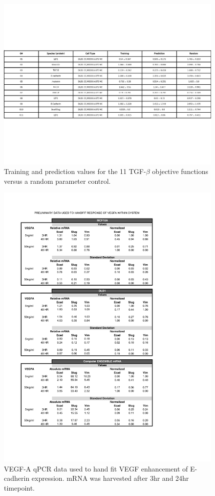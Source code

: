 \documentclass[12pt]{article}
\begin{document}
\begin{figure}
\includegraphics [width=1.0\linewidth] {./figs/FigSX_error_table.pdf}
\caption{Training and prediction values for the 11 TGF-$\beta$ objective functions versus a random parameter control.}\label{fig:SX}
\end{figure}

\begin{figure}
\includegraphics [width=1.0\linewidth] {./figs/FigSX2_Handfit_VEGFA.pdf}
\caption{VEGF-A qPCR data used to hand fit VEGF enhancement of E-cadherin expression. mRNA was harvested after 3hr and 24hr timepoint.}\label{fig:SX2}
\end{figure}
\end{document}
